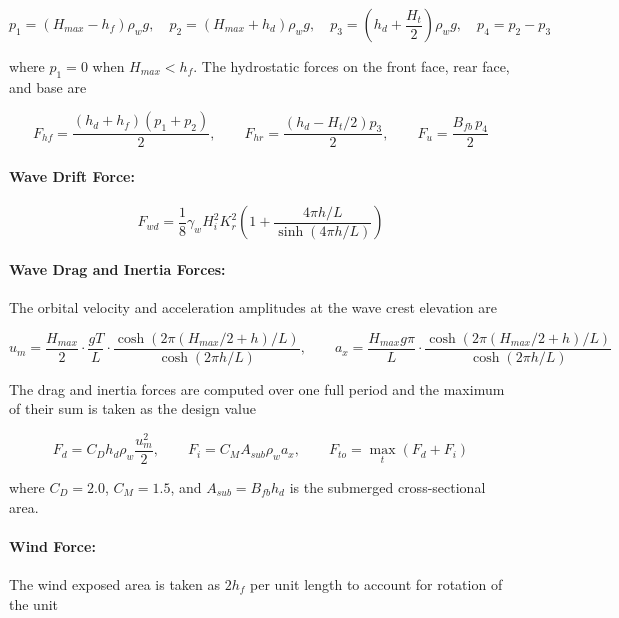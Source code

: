 \documentclass[a4paper, 11pt]{article}
\begin{document}
\begin{equation}
    p_1 = (H_{max} - h_f)\rho_w g, \quad p_2 = (H_{max} + h_d)\rho_w g, \quad p_3 = \left(h_d + \frac{H_t}{2}\right)\rho_w g, \quad p_4 = p_2 - p_3
\end{equation}

where $p_1 = 0$ when $H_{max} < h_f$. The hydrostatic forces on the front face, rear face, and base are

\begin{equation}
    F_{hf} = \frac{(h_d+h_f)(p_1+p_2)}{2}, \qquad F_{hr} = \frac{\left(h_d - H_t/2\right)p_3}{2}, \qquad F_u = \frac{B_{fb}\,p_4}{2}
\end{equation}

\paragraph{Wave Drift Force:}
\begin{equation}
    F_{wd} = \frac{1}{8}\gamma_w H_i^2 K_r^2 \left(1 + \frac{4\pi h/L}{\sinh(4\pi h/L)}\right)
\end{equation}

\paragraph{Wave Drag and Inertia Forces:} The orbital velocity and acceleration amplitudes at the wave crest elevation are

\begin{equation}
    u_m = \frac{H_{max}}{2}\cdot\frac{gT}{L}\cdot\frac{\cosh\!\left(2\pi(H_{max}/2+h)/L\right)}{\cosh(2\pi h/L)}, \qquad a_x = \frac{H_{max}g\pi}{L}\cdot\frac{\cosh\!\left(2\pi(H_{max}/2+h)/L\right)}{\cosh(2\pi h/L)}
\end{equation}

The drag and inertia forces are computed over one full period and the maximum of their sum is taken as the design value

\begin{equation}
    F_d = C_D h_d \rho_w \frac{u_m^2}{2}, \qquad F_i = C_M A_{sub} \rho_w a_x, \qquad F_{to} = \max_t(F_d + F_i)
\end{equation}

where $C_D = 2.0$, $C_M = 1.5$, and $A_{sub} = B_{fb}h_d$ is the submerged cross-sectional area.

\paragraph{Wind Force:} The wind exposed area is taken as $2h_f$ per unit length to account for rotation of the unit
\end{document}
